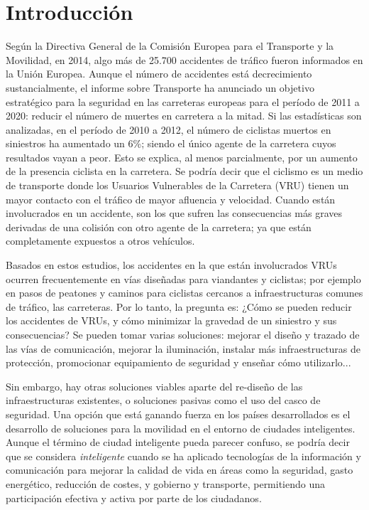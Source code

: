 \chapter{Introducción}
Según la Directiva General de la Comisión Europea para el Transporte y la Movilidad, en 2014, algo más de 25.700 accidentes de tráfico fueron informados en la Unión Europea. Aunque el número de accidentes está decrecimiento sustancialmente, el informe sobre Transporte ha anunciado un objetivo estratégico para la seguridad en las carreteras europeas para el período de 2011 a 2020: reducir el número de muertes en carretera a la mitad. Si las estadísticas son analizadas, en el período de 2010 a 2012, el número de ciclistas muertos en siniestros ha aumentado un 6\%; siendo el único agente de la carretera cuyos resultados vayan a peor. Esto se explica, al menos parcialmente, por un aumento de la presencia ciclista en la carretera. Se podría decir que el ciclismo es un medio de transporte donde los Usuarios Vulnerables de la Carretera (VRU) tienen un mayor contacto con el tráfico de mayor afluencia y velocidad. Cuando están involucrados en un accidente, son los que sufren las consecuencias más graves derivadas de una colisión con otro agente de la carretera; ya que están completamente expuestos a otros vehículos.

Basados en estos estudios, los accidentes en la que están involucrados VRUs ocurren frecuentemente en vías diseñadas para viandantes y ciclistas; por ejemplo en pasos de peatones y caminos para ciclistas cercanos a infraestructuras comunes de tráfico, las carreteras. Por lo tanto, la pregunta es: ¿Cómo se pueden reducir los accidentes de VRUs, y cómo minimizar la gravedad de un siniestro y sus consecuencias? Se pueden tomar varias soluciones: mejorar el diseño y trazado de las vías de comunicación, mejorar la iluminación, instalar más infraestructuras de protección, promocionar equipamiento de seguridad y enseñar cómo utilizarlo...

Sin embargo, hay otras soluciones viables aparte del re-diseño de las infraestructuras existentes, o soluciones pasivas como el uso del casco de seguridad. Una opción que está ganando fuerza en los países desarrollados es el desarrollo de soluciones para la movilidad en el entorno de ciudades inteligentes. Aunque el término de ciudad inteligente pueda parecer confuso, se podría decir que se considera \emph{inteligente} cuando se ha aplicado tecnologías de la información y comunicación para mejorar la calidad de vida en áreas como la seguridad, gasto energético, reducción de costes, y gobierno y transporte, permitiendo una participación efectiva y activa por parte de los ciudadanos.

